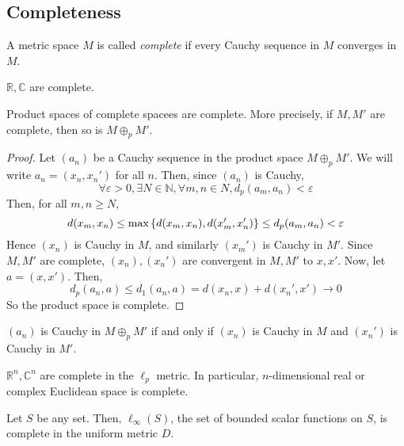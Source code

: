 \subsection{Completeness}
\begin{definition}
    A metric space \( M \) is called \textit{complete} if every Cauchy sequence in \( M \) converges in \( M \).
\end{definition}
\begin{example}
    \( \mathbb R, \mathbb C \) are complete.
\end{example}
\begin{proposition}
    Product spaces of complete spacees are complete.
    More precisely, if \( M, M' \) are complete, then so is \( M \oplus_p M' \).
\end{proposition}
\begin{proof}
    Let \( (a_n) \) be a Cauchy sequence in the product space \( M \oplus_p M' \).
    We will write \( a_n = (x_n, x_n') \) for all \( n \).
    Then, since \( (a_n) \) is Cauchy,
    \[ \forall \varepsilon > 0, \exists N \in \mathbb N, \forall m,n \in N, d_p(a_m, a_n) < \varepsilon \]
    Then, for all \( m, n \geq N \),
    \[ d(x_m,x_n) \leq \max\qty{d(x_m,x_n), d(x_m', x_n')} \leq d_p(a_m,a_n) < \varepsilon \]
    Hence \( (x_n) \) is Cauchy in \( M \), and similarly \( (x_m') \) is Cauchy in \( M' \).
    Since \( M, M' \) are complete, \( (x_n), (x_n') \) are convergent in \( M, M' \) to \( x, x' \).
    Now, let \( a = (x,x') \).
    Then,
    \[ d_p(a_n,a) \leq d_1(a_n,a) = d(x_n,x) + d(x_n',x') \to 0 \]
    So the product space is complete.
\end{proof}
\begin{remark}
    \( (a_n) \) is Cauchy in \( M \oplus_p M' \) if and only if \( (x_n) \) is Cauchy in \( M \) and \( (x_n') \) is Cauchy in \( M' \).
\end{remark}
\begin{corollary}
    \( \mathbb R^n, \mathbb C^n \) are complete in the \( \ell_p \) metric.
    In particular, \( n \)-dimensional real or complex Euclidean space is complete.
\end{corollary}
\begin{theorem}
    Let \( S \) be any set.
    Then, \( \ell_\infty(S) \), the set of bounded scalar functions on \( S \), is complete in the uniform metric \( D \).
\end{theorem}
